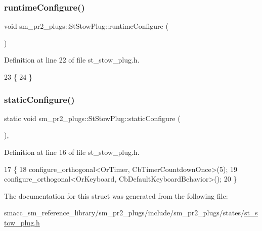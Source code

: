 \subsubsection{\texorpdfstring{runtime\+Configure()}{runtimeConfigure()}}
{\footnotesize\ttfamily void sm\+\_\+pr2\+\_\+plugs\+::\+St\+Stow\+Plug\+::runtime\+Configure (\begin{DoxyParamCaption}{ }\end{DoxyParamCaption})\hspace{0.3cm}{\ttfamily [inline]}}



Definition at line 22 of file st\+\_\+stow\+\_\+plug.\+h.


\begin{DoxyCode}
23     \{
24     \}
\end{DoxyCode}
\mbox{\label{structsm__pr2__plugs_1_1StStowPlug_a42733344b68d5558e349bf56db98efd6}} 
\subsubsection{\texorpdfstring{static\+Configure()}{staticConfigure()}}
{\footnotesize\ttfamily static void sm\+\_\+pr2\+\_\+plugs\+::\+St\+Stow\+Plug\+::static\+Configure (\begin{DoxyParamCaption}{ }\end{DoxyParamCaption})\hspace{0.3cm}{\ttfamily [inline]}, {\ttfamily [static]}}



Definition at line 16 of file st\+\_\+stow\+\_\+plug.\+h.


\begin{DoxyCode}
17     \{
18         configure\_orthogonal<OrTimer,  CbTimerCountdownOnce>(5);    
19         configure\_orthogonal<OrKeyboard, CbDefaultKeyboardBehavior>();
20     \}
\end{DoxyCode}


The documentation for this struct was generated from the following file\+:\begin{DoxyCompactItemize}
\item 
smacc\+\_\+sm\+\_\+reference\+\_\+library/sm\+\_\+pr2\+\_\+plugs/include/sm\+\_\+pr2\+\_\+plugs/states/\hyperlink{st__stow__plug_8h}{st\+\_\+stow\+\_\+plug.\+h}\end{DoxyCompactItemize}
